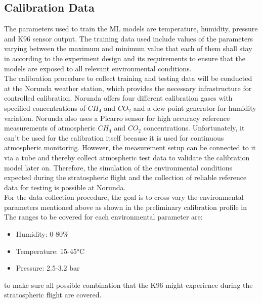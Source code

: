 \subsection*{Calibration Data}
The parameters used to train the ML models are temperature, humidity, pressure and K96 sensor output. The training data used include values of the parameters varying between the maximum and minimum value that each of them shall stay in according to the experiment design and its requirements to ensure that the models are exposed to all relevant environmental conditions. \\
The calibration procedure to collect training and testing data will be conducted at the Norunda weather station, which provides the necessary infrastructure for controlled calibration. Norunda offers four different calibration gases with specified concentrations of $CH_4$ and $CO_2$ and a dew point generator for humidity variation. Norunda also uses a Picarro sensor for high accuracy reference measurements of atmospheric $CH_4$ and $CO_2$ concentrations. Unfortunately, it can't be used for the calibration itself because it is used for continuous atmospheric monitoring. However, the measurement setup can be connected to it via a tube and thereby collect atmospheric test data to validate the calibration model later on. Therefore, the simulation of the environmental conditions expected 
during the stratospheric flight and the collection of reliable reference data for testing is possible at Norunda. \\
For the data collection procedure, the goal is to cross vary the environmental parameters mentioned above as shown in the preliminary calibration profile in 
The ranges to be covered for each environmental parameter are:
\begin{itemize}
  \item Humidity: 0-80\%
  \item Temperature: 15-45°C
  \item Pressure: 2.5-3.2 bar
\end{itemize}   
to make sure all possible combination that the K96 might experience during the stratospheric flight are covered.




